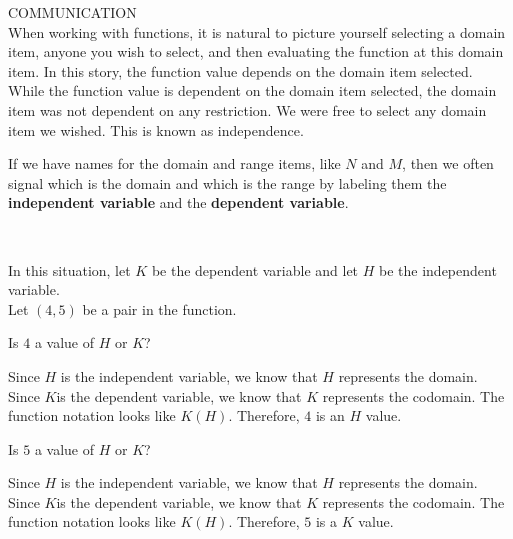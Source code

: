 \documentclass{ximera}
\begin{document}
\begin{remark} COMMUNICATION \\
When working with functions, it is natural to picture yourself selecting a domain item, anyone you wish to select, and then evaluating the function at this domain item. In this story, the function value depends on the domain item selected. While the function value is dependent on the domain item selected, the domain item was not dependent on any restriction.  We were free to select any domain item we wished. This is known as independence.

If we have names for the domain and range items, like $N$ and $M$, then we often signal which is the domain and which is the range by labeling them the \textbf{independent variable} and the \textbf{dependent variable}.
\end{remark}
\quad \\


\begin{example}
In this situation, let $K$ be the dependent variable and let $H$ be the independent variable.\\
Let $(4, 5)$ be a pair in the function.\\

\begin{question}
Is $4$ a value of $H$ or $K$?
\begin{multipleChoice}
\end{multipleChoice}
\begin{feedback}
Since $H$ is the independent variable, we know that $H$ represents the domain. Since $K $is the dependent variable, we know that $K$ represents the codomain. The function notation looks like $K(H)$.
Therefore, $4$ is an $H$ value.
\end{feedback}
\end{question}


\begin{question}
Is $5$ a value of $H$ or $K$?
\begin{multipleChoice}
\end{multipleChoice}
\begin{feedback}
Since $H$ is the independent variable, we know that $H$ represents the domain. Since $K $is the dependent variable, we know that $K$ represents the codomain. The function notation looks like $K(H)$.
Therefore, $5$ is a $K$ value.
\end{feedback}
\end{question}

\end{example}
\end{document}
